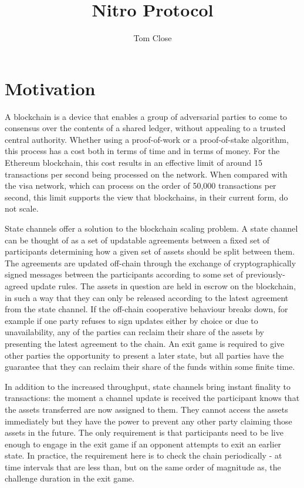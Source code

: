 \documentclass{article}
\title{Nitro Protocol}
\author{Tom Close}
\begin{document}
\maketitle

\section{Motivation}

A blockchain is a device that enables a group of adversarial parties to come to consensus over the contents of a shared ledger, without appealing to a trusted central authority. 
Whether using a proof-of-work or a proof-of-stake algorithm, this process has a cost both in terms of time and in terms of money.
For the Ethereum blockchain, this cost results in an effective limit of around 15 transactions per second being processed on the network.
When compared with the visa network, which can process on the order of 50,000 transactions per second, this limit supports the view that blockchains, in their current form, do not scale.

State channels offer a solution to the blockchain scaling problem.
A state channel can be thought of as a set of updatable agreements between a fixed set of participants determining how a given set of assets should be split between them.
The agreements are updated off-chain through the exchange of cryptographically signed messages between the participants according to some set of previously-agreed update rules. 
The assets in question are held in escrow on the blockchain, in such a way
that they can only be released according to the latest agreement from the state channel.
If the off-chain cooperative behaviour breaks down, for example if one party refuses to sign updates either by choice or due to unavailability, any of the parties can reclaim their share of the assets by presenting the latest agreement to the chain.
An exit game is required to give other parties the opportunity to present a later state, but all parties have the guarantee that they can reclaim their share of the funds within some finite time.

In addition to the increased throughput, state channels bring instant finality to transactions: the moment a channel update is received the participant knows that the assets transferred are now assigned to them.
They cannot access the assets immediately but they have the power to prevent any other party claiming those assets in the future.
The only requirement is that participants need to be live enough to engage in the exit game if an opponent attempts to exit an earlier state.
In practice, the requirement here is to check the chain periodically - at time intervals that are less than, but on the same order of magnitude as, the challenge duration in the exit game.
\end{document}
